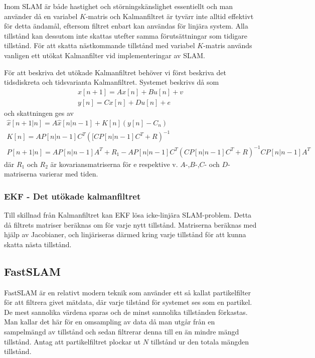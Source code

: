 \documentclass[a4paper,12pt,fleqn]{article}
\begin{document}
Inom SLAM är både hastighet och störningskänslighet essentiellt och man använder då en variabel $K$-matris och Kalmanfiltret är tyvärr inte alltid effektivt för detta ändamål, eftersom filtret enbart kan användas för linjära system. Alla tillstånd kan dessutom inte skattas utefter samma förutsättningar som tidigare tillstånd. För att skatta nästkommande tillstånd med variabel $K$-matris används vanligen ett utökat Kalmanfilter vid implementeringar av SLAM. 

För att beskriva det utökade Kalmanfiltret behöver vi först beskriva det tidsdiskreta och tidsvarianta Kalmanfiltret. Systemet beskrivs då som 
\begin{gather}
x[n+1] = Ax[n] + Bu[n]+v \\
y[n] = Cx[n] + Du[n] + e
\end{gather}
och skattningen ges av
\begin{gather}
	\hat{x}[n+1|n] = A\hat{x}[n|n-1] + K[n](y[n]-C_n) \\
	K[n]=AP[n|n-1]C^T([CP[n|n-1]C^T+R)^{-1}	\\
	P[n+1|n]=AP[n|n-1]A^T+R_{1} 
	        -AP[n|n-1]C^T(CP[n|n-1]C^T+R)^{-1}CP[n|n-1]A^T
\end{gather}
där $R_1$ och $R_2$ är kovariansmatriserna för e respektive v. $A$-,$B$-,$C$- och $D$-matriserna varierar med tiden.  

\subsubsection{EKF - Det utökade kalmanfiltret}

Till skillnad från Kalmanfiltret kan EKF lösa icke-linjära SLAM-problem. Detta då filtrets matriser beräknas om för varje nytt tillstånd. Matriserna beräknas med hjälp av Jacobianer, och linjäriseras därmed kring varje tillstånd för att kunna skatta nästa tillstånd. 

\subsection{FastSLAM}
FastSLAM är en relativt modern teknik som använder ett så kallat partikelfilter för att filtrera givet mätdata, där varje tilstånd för systemet ses som en partikel. De mest sannolika värdena sparas och de minst sannolika tillstånden förkastas. Man kallar det här för en omsampling av data då man utgår från en sampelmängd av tillstånd och sedan filtrerar denna till en än mindre mängd tillstånd. Antag att partikelfiltret plockar ut $N$ tillstånd ur den totala mängden tillstånd. 
\end{document}
